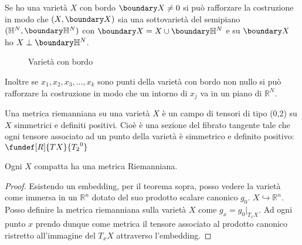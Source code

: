 Se ho una varietà $X$ con bordo $\boundary X \neq 0$ si può rafforzare la costruzione in modo che $(X, \boundary X)$ sia una sottovarietà del semipiano 
$(\mathbb{H}^{N}, \boundary \mathbb{H}^{N})$ con $\boundary X = X \cup \boundary \mathbb{H}^{N}$ e su $\boundary X$ ho $X \perp \boundary \mathbb{H}^{N}$.

\begin{figure}
    \centering %
    
    \caption{Varietà con bordo}
\end{figure}

Inoltre se $x_{1}, x_{2}, x_{3}, \dots, x_{k}$ sono punti della varietà con bordo non nullo si può rafforzare la costruzione in modo che un intorno di $x_{j}$ va in un piano di $\mathbb{R}^{N}$.

\begin{defn} %
 Una metrica riemanniana su una varietà $X$ è un campo di tensori di tipo (0,2) su $X$ simmetrici e definiti positivi. Cioè è una sezione del 
 fibrato tangente tale che ogni tensore associato ad un punto della varietà è simmetrico e definito positivo: $\fundef[R]{TX}{{T_{2}}^{0}}$ 
\end{defn}

\begin{teo}
Ogni $X$ compatta ha una metrica Riemanniana.
\end{teo}

\begin{proof}
  Esistendo un embedding, per il teorema sopra, posso vedere la varietà come immersa in un $\mathbb{R}^{n}$ dotato del suo prodotto scalare canonico $g_{0}$. $X \hookrightarrow \mathbb{R}^{n}$.
  Posso definire la metrica riemanniana sulla varietà $X$ come $g_{x} = g_{0}|_{T_x X}$.
 Ad ogni punto $x$ prendo dunque come metrica il tensore associato al prodotto canonico ristretto all'immagine del $T_x X$ attraverso l'embedding.
\end{proof}




